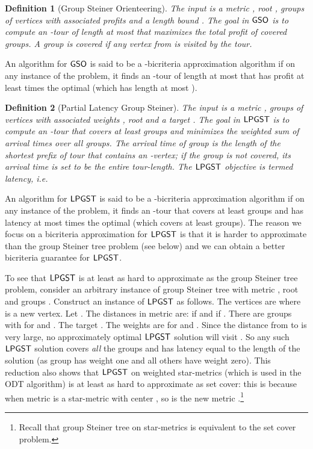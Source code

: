 \documentclass[11pt]{article}
\newtheorem{definition}{Definition}
\def\odt{{\sf ODT}\xspace}
\def\lpgst{\ensuremath{{\sf LPGST}}\xspace}
\def\gso{\ensuremath{{\sf GSO}}\xspace}
\begin{document}
\begin{definition}[Group Steiner Orienteering]\label{def:gso}
The input is a metric , root ,  groups of 
vertices  with associated profits  and a length bound . The goal in \gso is
to compute an -tour of length at most  that maximizes the total profit of covered groups. A group 
is covered if any vertex from  is visited by the tour. 
\end{definition}
\smallskip
An algorithm for \gso is said to be a  -bicriteria approximation algorithm if on any instance of the problem, it finds an -tour of length at most  that has profit at least  times the optimal (which has length at most ). 

\smallskip

\begin{definition}[Partial Latency Group Steiner]\label{def:lpgs} The input is 
a metric ,  groups of vertices  with associated weights
, root  and a target . The goal in \lpgst is to compute an -tour   
that covers at least  groups and minimizes the weighted sum of arrival times over all groups. The \emph{arrival  time} of group  is the length of the shortest prefix of tour    
that contains an -vertex; if the group is not covered, its arrival time is set to be the entire tour-length. The \lpgst objective  is termed {\em latency}, i.e. 
 
\end{definition}
\smallskip
An algorithm for \lpgst is said to be a  -bicriteria approximation algorithm if on any instance of the problem, it finds an -tour that covers at least  groups and has latency at most  times the optimal (which  covers at least  groups). The reason we focus on a bicriteria approximation for \lpgst is that it is harder to approximate than the group Steiner tree problem (see below) and we can obtain  a better bicriteria guarantee for \lpgst. 

To see that \lpgst is at least as hard to approximate as the group Steiner tree problem, consider an arbitrary instance of group Steiner tree with metric , root  and  groups  . Construct an instance of \lpgst as follows. The vertices are  where  is a new vertex. Let . The distances in metric  are:  if  and  if . 
There are  groups with  for  and . The target . The weights are  for  and . Since the distance from  to  is very large, no approximately optimal \lpgst solution will visit . So any such \lpgst solution covers {\em all} the groups  and has latency equal to the length of the solution (as group  has weight one  and all others have weight zero).  This reduction also shows that \lpgst on weighted star-metrics (which is used in the \odt algorithm) is at least as hard to approximate as set cover: this is because when  metric  is a star-metric with center , so is the  new metric .\footnote{Recall that group Steiner tree on star-metrics is equivalent to the set cover problem.}   
\end{document}

